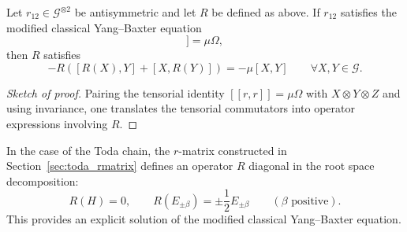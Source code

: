 \begin{proposition}
    Let $r_{12} \in \mathcal{G}^{\otimes 2}$ be antisymmetric and let $R$ be defined as above.  
    If $r_{12}$ satisfies the modified classical Yang--Baxter equation
    \begin{equation}
        [[r,r]] = \mu \Omega,
    \end{equation}
    then $R$ satisfies
    \begin{equation}
        [R(X),R(Y)] - R\left([R(X),Y] + [X,R(Y)]\right) = -\mu [X,Y]
        \qquad \forall X,Y \in \mathcal{G}.
    \end{equation}
\end{proposition}

\begin{proof}[Sketch of proof]
    Pairing the tensorial identity $[[r,r]]=\mu\Omega$ with $X \otimes Y \otimes Z$
    and using invariance, one translates the tensorial commutators into operator expressions involving $R$.
\end{proof}

In the case of the Toda chain, the $r$-matrix constructed in Section~\ref{sec:toda_rmatrix}
defines an operator $R$ diagonal in the root space decomposition:
\begin{equation}
    R(H)=0, \qquad
    R(E_{\pm\beta}) = \pm \frac12 E_{\pm\beta}
    \qquad (\beta \text{ positive}).
\end{equation}
This provides an explicit solution of the modified classical Yang--Baxter equation. 